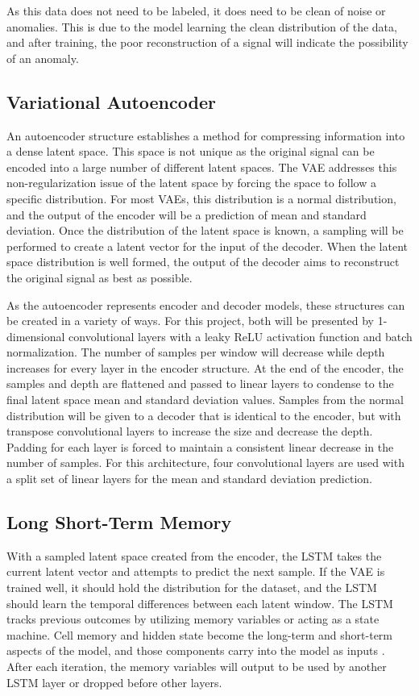 \documentclass[conference]{IEEEtran}
\begin{document}
As this data does not need to be labeled, it does need to be clean of noise or anomalies. This is due to the model learning the clean distribution of the data, and after training, the poor reconstruction of a signal will indicate the possibility of an anomaly.


\subsection{Variational Autoencoder}
An autoencoder structure establishes a method for compressing information into a dense latent space. This space is not unique as the original signal can be encoded into a large number of different latent spaces. The VAE addresses this non-regularization issue of the latent space by forcing the space to follow a specific distribution\cite{vae_page}. For most VAEs, this distribution is a normal distribution, and the output of the encoder will be a prediction of mean and standard deviation. Once the distribution of the latent space is known, a sampling will be performed to create a latent vector for the input of the decoder. When the latent space distribution is well formed, the output of the decoder aims to reconstruct the original signal as best as possible.

As the autoencoder represents encoder and decoder models, these structures can be created in a variety of ways. For this project, both will be presented by 1-dimensional convolutional layers with a leaky ReLU activation function and batch normalization. The number of samples per window will decrease while depth increases for every layer in the encoder structure. At the end of the encoder, the samples and depth are flattened and passed to linear layers to condense to the final latent space mean and standard deviation values. Samples from the normal distribution will be given to a decoder that is identical to the encoder, but with transpose convolutional layers to increase the size and decrease the depth. Padding for each layer is forced to maintain a consistent  linear decrease in the number of samples. For this architecture, four convolutional layers are used with a split set of linear layers for the mean and standard deviation prediction.

\subsection{Long Short-Term Memory}
With a sampled latent space created from the encoder, the LSTM takes the current latent vector and attempts to predict the next sample. If the VAE is trained well, it should hold the distribution for the dataset, and the LSTM should learn the temporal differences between each latent window. The LSTM tracks previous outcomes by utilizing memory variables or acting as a state machine. Cell memory and hidden state become the long-term and short-term aspects of the model, and those components carry into the model as inputs \cite{lstm_page}. After each iteration, the memory variables will output to be used by another LSTM layer or dropped before other layers.
\end{document}
